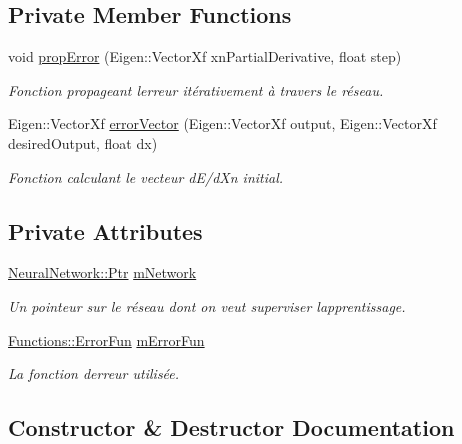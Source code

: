 \subsection*{Private Member Functions}
\begin{DoxyCompactItemize}
\item 
void \hyperlink{classTeacher_acee32b743a46129225b5b1a869049546}{prop\+Error} (Eigen\+::\+Vector\+Xf xn\+Partial\+Derivative, float step)
\begin{DoxyCompactList}\small\item\em Fonction propageant l\textquotesingle{}erreur itérativement à travers le réseau. \end{DoxyCompactList}\item 
Eigen\+::\+Vector\+Xf \hyperlink{classTeacher_a14125a53f4ca3ec65fe49369ab893cf1}{error\+Vector} (Eigen\+::\+Vector\+Xf output, Eigen\+::\+Vector\+Xf desired\+Output, float dx)
\begin{DoxyCompactList}\small\item\em Fonction calculant le vecteur d\+E/d\+Xn initial. \end{DoxyCompactList}\end{DoxyCompactItemize}
\subsection*{Private Attributes}
\begin{DoxyCompactItemize}
\item 
\hyperlink{classNeuralNetwork_a31de381df65f261fd0f38e0559995d1a}{Neural\+Network\+::\+Ptr} \hyperlink{classTeacher_ae1cf0d1d29e47fd8bcf9b79b5ec52839}{m\+Network}
\begin{DoxyCompactList}\small\item\em Un pointeur sur le réseau dont on veut superviser l\textquotesingle{}apprentissage. \end{DoxyCompactList}\item 
\hyperlink{structFunctions_a834bc4170f1caa8c77272ecf51dbae5c}{Functions\+::\+Error\+Fun} \hyperlink{classTeacher_ab58537b6ced063a5a6e7cd6b94ecd203}{m\+Error\+Fun}
\begin{DoxyCompactList}\small\item\em La fonction d\textquotesingle{}erreur utilisée. \end{DoxyCompactList}\end{DoxyCompactItemize}


\subsection{Constructor \& Destructor Documentation}
\mbox{\label{classTeacher_a8ca95fc7a29e082a676d420b9fd8fd67}} 
